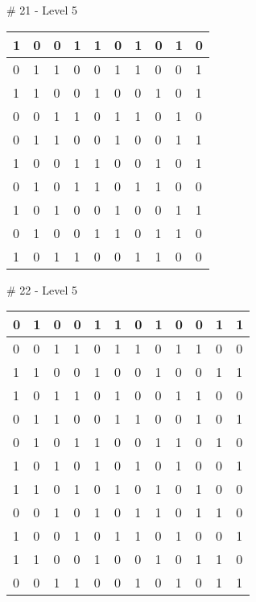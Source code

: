 \smallskip

\# 21 - Level 5 \newline
\begin{tabular}{|m{\collen}|m{\collen}|m{\collen}|m{\collen}|m{\collen}|m{\collen}|m{\collen}|m{\collen}|m{\collen}|m{\collen}|}
\hline
  1 & 0 & 0 & 1 & 1 & 0 & 1 & 0 & 1 & 0 \\
\hline
  0 & 1 & 1 & 0 & 0 & 1 & 1 & 0 & 0 & 1 \\
\hline
  1 & 1 & 0 & 0 & 1 & 0 & 0 & 1 & 0 & 1 \\
\hline
  0 & 0 & 1 & 1 & 0 & 1 & 1 & 0 & 1 & 0 \\
\hline
  0 & 1 & 1 & 0 & 0 & 1 & 0 & 0 & 1 & 1 \\
\hline
  1 & 0 & 0 & 1 & 1 & 0 & 0 & 1 & 0 & 1 \\
\hline
  0 & 1 & 0 & 1 & 1 & 0 & 1 & 1 & 0 & 0 \\
\hline
  1 & 0 & 1 & 0 & 0 & 1 & 0 & 0 & 1 & 1 \\
\hline
  0 & 1 & 0 & 0 & 1 & 1 & 0 & 1 & 1 & 0 \\
\hline
  1 & 0 & 1 & 1 & 0 & 0 & 1 & 1 & 0 & 0 \\
\hline
\end{tabular}


\smallskip

\# 22 - Level 5 \newline
\begin{tabular}{|m{\collen}|m{\collen}|m{\collen}|m{\collen}|m{\collen}|m{\collen}|m{\collen}|m{\collen}|m{\collen}|m{\collen}|m{\collen}|m{\collen}|}
\hline
  0 & 1 & 0 & 0 & 1 & 1 & 0 & 1 & 0 & 0 & 1 & 1 \\
\hline
  0 & 0 & 1 & 1 & 0 & 1 & 1 & 0 & 1 & 1 & 0 & 0 \\
\hline
  1 & 1 & 0 & 0 & 1 & 0 & 0 & 1 & 0 & 0 & 1 & 1 \\
\hline
  1 & 0 & 1 & 1 & 0 & 1 & 0 & 0 & 1 & 1 & 0 & 0 \\
\hline
  0 & 1 & 1 & 0 & 0 & 1 & 1 & 0 & 0 & 1 & 0 & 1 \\
\hline
  0 & 1 & 0 & 1 & 1 & 0 & 0 & 1 & 1 & 0 & 1 & 0 \\
\hline
  1 & 0 & 1 & 0 & 1 & 0 & 1 & 0 & 1 & 0 & 0 & 1 \\
\hline
  1 & 1 & 0 & 1 & 0 & 1 & 0 & 1 & 0 & 1 & 0 & 0 \\
\hline
  0 & 0 & 1 & 0 & 1 & 0 & 1 & 1 & 0 & 1 & 1 & 0 \\
\hline
  1 & 0 & 0 & 1 & 0 & 1 & 1 & 0 & 1 & 0 & 0 & 1 \\
\hline
  1 & 1 & 0 & 0 & 1 & 0 & 0 & 1 & 0 & 1 & 1 & 0 \\
\hline
  0 & 0 & 1 & 1 & 0 & 0 & 1 & 0 & 1 & 0 & 1 & 1 \\
\hline
\end{tabular}


